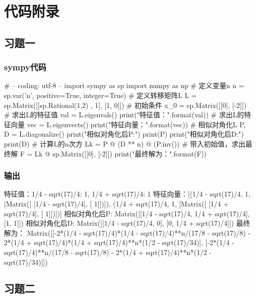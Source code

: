 \chapter{代码附录}
\section{习题一}
\subsection{sympy代码}
\begin{python}
    # -- coding: utf-8 --
import sympy as sp
import numpy as np
# 定义变量n
n = sp.var('n', positive=True, integer=True)
# 定义转移矩阵L
L = sp.Matrix([[sp.Rational(1,2) , 1],
               [1, 0]])
# 初始条件
x_0 = sp.Matrix([[0], [-2]])
# 求出L的特征值
val = L.eigenvals()
print("特征值：{}".format(val))
# 求出L的特征向量
vec = L.eigenvects()
print("特征向量：{}".format(vec))
# 相似对角化L
P, D = L.diagonalize()
print("相似对角化后P:")
print(P)
print("相似对角化后D:")
print(D)
# 计算L的n次方
Lk = P @ (D ** n) @ (P.inv())
# 带入初始值，求出最终解
F = Lk @ sp.Matrix([[0], [-2]])
print("最终解为：\n{}".format(F))
\end{python}

\subsection{输出}
\begin{python}
    特征值：{1/4 - sqrt(17)/4: 1, 1/4 + sqrt(17)/4: 1}
特征向量：[(1/4 - sqrt(17)/4, 1, [Matrix([
[1/4 - sqrt(17)/4],
[               1]])]), (1/4 + sqrt(17)/4, 1, [Matrix([
[1/4 + sqrt(17)/4],
[               1]])])]
相似对角化后P:
Matrix([[1/4 - sqrt(17)/4, 1/4 + sqrt(17)/4], [1, 1]])
相似对角化后D:
Matrix([[1/4 - sqrt(17)/4, 0], [0, 1/4 + sqrt(17)/4]])
最终解为：
Matrix([[-2*(1/4 - sqrt(17)/4)*(1/4 - sqrt(17)/4)**n/(17/8 - sqrt(17)/8) - 2*(1/4 + sqrt(17)/4)*(1/4 + sqrt(17)/4)**n*(1/2 - sqrt(17)/34)], [-2*(1/4 - sqrt(17)/4)**n/(17/8 - sqrt(17)/8) - 2*(1/4 + sqrt(17)/4)**n*(1/2 - sqrt(17)/34)]])

\end{python}
\section{习题二}
